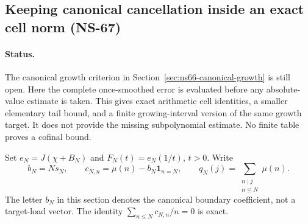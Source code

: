 \documentclass[11pt]{article}
\theoremstyle{remark}
\begin{document}
\subsection{Keeping canonical cancellation inside an exact cell norm (NS-67)}
\label{sec:ns67-canonical-cells}

\paragraph{Status.}
The canonical growth criterion in Section~\ref{sec:ns66-canonical-growth}
is still open. Here the complete once-smoothed error is evaluated before
any absolute-value estimate is taken. This gives exact arithmetic cell
identities, a smaller elementary tail bound, and a finite growing-interval
version of the same growth target. It does not provide the missing
subpolynomial estimate. No finite table proves a cofinal bound.

Set $e_N=J(\chi+B_N)$ and $F_N(t)=e_N(1/t)$, $t>0$.
Write
\[
 b_N=Ns_N,\qquad c_{N,n}=\mu(n)-b_N\mathbf1_{n=N},\qquad
 q_N(j)=\sum_{\substack{n\mid j\\n\leq N}}\mu(n).
\]
The letter $b_N$ in this section denotes the canonical boundary
coefficient, not a target-load vector. The identity
$\sum_{n\leq N}c_{N,n}/n=0$ is exact.
\end{document}
